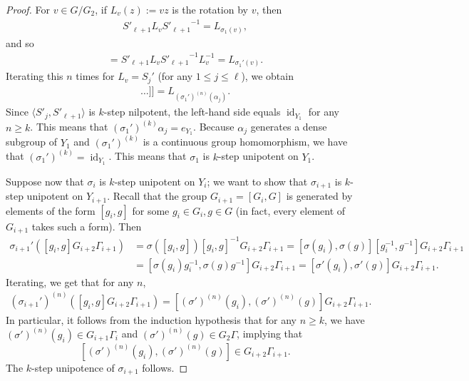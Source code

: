 \documentclass[11pt]{amsart}
\theoremstyle{definition}
\newcommand{\inv}{^{-1}}
\newcommand{\1}{{\mathbf{1}}}
\DeclareMathOperator{\id}{id}
\DeclareMathOperator{\Id}{id}
\begin{document}
\begin{proof}
For $v\in G/G_2$, if $L_v(z) := vz$ is the rotation by $v$, then  
\begin{align*}
    {S'_{\ell+1}} L_v {S'_{\ell+1}}^{-1} = L_{\sigma_1(v)},
\end{align*}
and so 
\begin{align*}
    [{S'_{\ell+1}}\inv, L_v\inv] = {S'_{\ell+1}}L_v{S'_{\ell+1}}^{-1}L_v\inv %
    = L_{\sigma_1'(v)}.
\end{align*}
Iterating this $n$ times for $L_v = S_j'$ (for any $1\leq j\leq\ell$), we obtain 
\begin{align*}
  [{S'_{\ell+1}}\inv, [{S'_{\ell+1}}\inv, \dots, [{S'_{\ell+1}}\inv, {{S'_j}}\inv]\dots]] = L_{(\sigma_1')^{(n)}(\alpha_j)}.
\end{align*}
Since $\langle {S'_j}, {S'_{\ell+1}}\rangle$ is $k$-step nilpotent, the left-hand side equals $\Id_{Y_1}$ for any $n\geq k$.  This means that $(\sigma_1')^{(k)}\alpha_j = e_{Y_1}$.
Because $\alpha_j$ generates a dense subgroup of ${Y_1}$ and $(\sigma_1')^{(k)}$ 
is a continuous group homomorphism, we have that 
$(\sigma_1')^{(k)} = \id_{Y_1}$.
This means that $\sigma_1$ is $k$-step unipotent on ${Y_1}$. 

Suppose now that $\sigma_i$ is $k$-step unipotent on $Y_i$; we want to show that $\sigma_{i+1}$ is $k$-step unipotent on $Y_{i+1}$. Recall that the group $G_{i+1} = [G_i, G]$ is generated by elements of the form $[g_i,g]$ for some $g_i\in G_i, g\in G$ (in fact, every element of $G_{i+1}$ takes such a form). Then
\begin{align*}
    \sigma_{i+1}'([g_i, g]G_{i+2}\Gamma_{i+1}) &= \sigma([g_i,g])[g_i,g]\inv G_{i+2}\Gamma_{i+1} = [\sigma(g_i),\sigma(g)][g_i\inv, g\inv]G_{i+2}\Gamma_{i+1}\\
    &= [\sigma(g_i)g_i\inv,\sigma(g)g\inv]G_{i+2}\Gamma_{i+1} = [\sigma'(g_i),\sigma'(g)]G_{i+2}\Gamma_{i+1}.
\end{align*}
Iterating, we get that for any $n$,
\begin{align*}
    (\sigma_{i+1}')^{(n)}([g_i, g]G_{i+2}\Gamma_{i+1}) = [(\sigma')^{(n)}(g_i),(\sigma')^{(n)}(g)]G_{i+2}\Gamma_{i+1}.
\end{align*}
In particular, it follows from the induction hypothesis that for any $n\geq k$, we have $(\sigma')^{(n)}(g_i)\in G_{i+1}\Gamma_{i}$ and $(\sigma')^{(n)}(g)\in G_2\Gamma$, implying that
$$[(\sigma')^{(n)}(g_i),(\sigma')^{(n)}(g)]\in G_{i+2}\Gamma_{i+1}.$$
The $k$-step unipotence of $\sigma_{i+1}$ follows. 


\end{proof}
\end{document}
